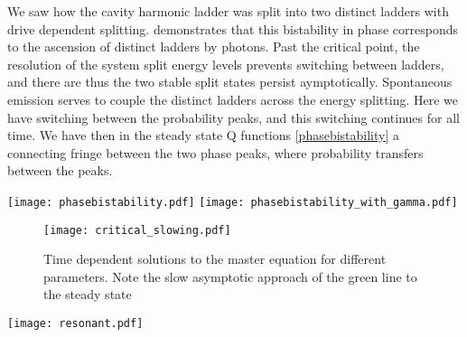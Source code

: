 We saw how the cavity harmonic ladder was split into two distinct ladders with drive dependent splitting. 
\cite{Carmichael2015} demonstrates that this bistability in phase corresponds to the ascension of distinct ladders by photons. 
Past the critical point, the resolution of the system split energy levels prevents switching between ladders, and there are thus the two stable split states persist aymptotically. 
Spontaneous emission serves to couple the distinct ladders across the energy splitting. 
Here we have switching between the probability peaks, and this switching continues for all time. 
We have then in the steady state Q functions \cref{phasebistability} a connecting fringe between the two phase peaks, where probability transfers between the peaks. 
\begin{figure*}[t]
  \texttt{[image: phasebistability.pdf]}
  \texttt{[image: phasebistability\_with\_gamma.pdf]}
  \caption{Development of phase bistability in Q function. Parameters $\omega_c = \omega_q = \omega_d ,\ \kappa=1,\ g=10$. Value of $\xi$ marked. (a) With spontaneous emission (b) without spontaneous emission}
  \label{phasebistability}
\end{figure*}
\begin{figure}[h]
  \texttt{[image: critical\_slowing.pdf]}
  \caption{Time dependent solutions to the master equation for different parameters. Note the slow asymptotic approach of the green line to the steady state}
  \label{critical_slowing}
\end{figure}
\begin{figure*}[!htb]
    \texttt{[image: resonant.pdf]}
    \caption{(a) Intracavity photon number in the semiclassical approximation (upper, stable solution) (b) Intracavity photon number, fully quantum, with a field Hilbert space truncated at 85 excitations (c) Q functions with increasing drive on resonance}
    \label{resonant}
\end{figure*}
